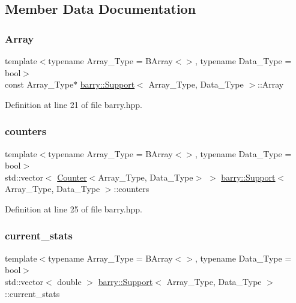 \subsection{Member Data Documentation}
\mbox{\label{classbarry_1_1_support_a782b1912d7fa2963d79d48a50947f033}} 
\subsubsection{\texorpdfstring{Array}{Array}}
{\footnotesize\ttfamily template$<$typename Array\+\_\+\+Type  = B\+Array$<$$>$, typename Data\+\_\+\+Type  = bool$>$ \\
const Array\+\_\+\+Type$\ast$ \hyperlink{classbarry_1_1_support}{barry\+::\+Support}$<$ Array\+\_\+\+Type, Data\+\_\+\+Type $>$\+::Array}



Definition at line 21 of file barry.\+hpp.

\mbox{\label{classbarry_1_1_support_a9615cb720931f81b57d5caa272b969ab}} 
\subsubsection{\texorpdfstring{counters}{counters}}
{\footnotesize\ttfamily template$<$typename Array\+\_\+\+Type  = B\+Array$<$$>$, typename Data\+\_\+\+Type  = bool$>$ \\
std\+::vector$<$ \hyperlink{classbarry_1_1_counter}{Counter}$<$Array\+\_\+\+Type, Data\+\_\+\+Type$>$ $>$ \hyperlink{classbarry_1_1_support}{barry\+::\+Support}$<$ Array\+\_\+\+Type, Data\+\_\+\+Type $>$\+::counters}



Definition at line 25 of file barry.\+hpp.

\mbox{\label{classbarry_1_1_support_a094f0851c7d6bfa7876eb0df2be4439e}} 
\subsubsection{\texorpdfstring{current\+\_\+stats}{current\_stats}}
{\footnotesize\ttfamily template$<$typename Array\+\_\+\+Type  = B\+Array$<$$>$, typename Data\+\_\+\+Type  = bool$>$ \\
std\+::vector$<$ double $>$ \hyperlink{classbarry_1_1_support}{barry\+::\+Support}$<$ Array\+\_\+\+Type, Data\+\_\+\+Type $>$\+::current\+\_\+stats}



